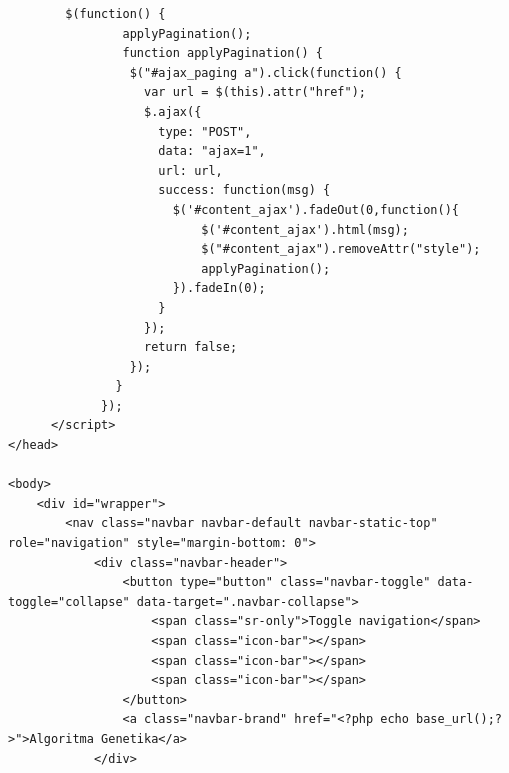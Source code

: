 \begin{enumerate}
\begin{lstlisting}
        $(function() {
                applyPagination();
                function applyPagination() {
                 $("#ajax_paging a").click(function() {             
                   var url = $(this).attr("href");
                   $.ajax({
                     type: "POST",
                     data: "ajax=1",
                     url: url, 
                     success: function(msg) {
                       $('#content_ajax').fadeOut(0,function(){
                           $('#content_ajax').html(msg);
                           $("#content_ajax").removeAttr("style");
                           applyPagination();                 
                       }).fadeIn(0);                       
                     }
                   });              
                   return false;
                 });
               }
             });
      </script>
</head>

<body>
    <div id="wrapper">
        <nav class="navbar navbar-default navbar-static-top" role="navigation" style="margin-bottom: 0">
            <div class="navbar-header">
                <button type="button" class="navbar-toggle" data-toggle="collapse" data-target=".navbar-collapse">
                    <span class="sr-only">Toggle navigation</span>
                    <span class="icon-bar"></span>
                    <span class="icon-bar"></span>
                    <span class="icon-bar"></span>
                </button>
                <a class="navbar-brand" href="<?php echo base_url();?>">Algoritma Genetika</a>
            </div>


\end{lstlisting}
\end{enumerate}
